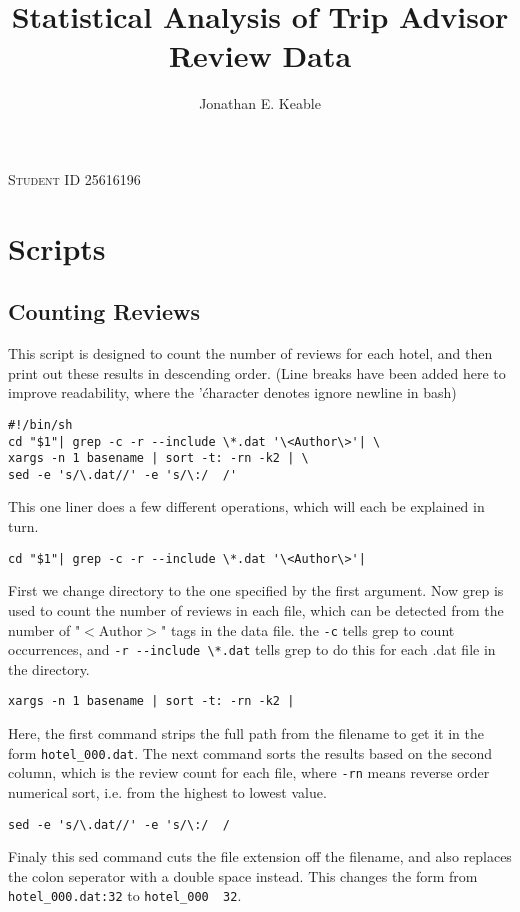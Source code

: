 \documentclass[10pt]{article}
\author{Jonathan E. Keable}
\title{Statistical Analysis of Trip Advisor Review Data}
\begin{document}

\maketitle
\begin{center}
\textsc{Student ID 25616196}
\end{center}

\pagebreak

\section{Scripts}

\subsection{Counting Reviews}
This script is designed to count the number of reviews for each hotel, and then print out these results in descending order. (Line breaks have been added here to improve readability, where the '\' character denotes ignore newline in bash)
\begin{lstlisting}
#!/bin/sh
cd "$1"| grep -c -r --include \*.dat '\<Author\>'| \
xargs -n 1 basename | sort -t: -rn -k2 | \
sed -e 's/\.dat//' -e 's/\:/  /'
\end{lstlisting}
This one liner does a few different operations, which will each be explained in turn.
\begin{lstlisting}
cd "$1"| grep -c -r --include \*.dat '\<Author\>'|
\end{lstlisting}
First we change directory to the one specified by the first argument. Now grep is used to count the number of  reviews in each file, which can be detected from the number of "$<$Author$>$" tags in the data file. the \lstinline$-c$ tells grep to count occurrences, and \lstinline$-r --include \*.dat$ tells grep to do this for each .dat file in the directory.
\begin{lstlisting}
xargs -n 1 basename | sort -t: -rn -k2 |
\end{lstlisting}
Here, the first command strips the full path from the filename to get it in the form \lstinline$hotel_000.dat$. The next command sorts the results based on the second column, which is the review count for each file, where \lstinline$-rn$ means reverse order numerical sort, i.e. from the highest to lowest value.
\begin{lstlisting}
sed -e 's/\.dat//' -e 's/\:/  /
\end{lstlisting}
Finaly this sed command cuts the file extension off the filename, and also replaces the colon seperator with a double space instead. This changes the form from \lstinline$hotel_000.dat:32$ to \lstinline$hotel_000  32$.
\end{document}
